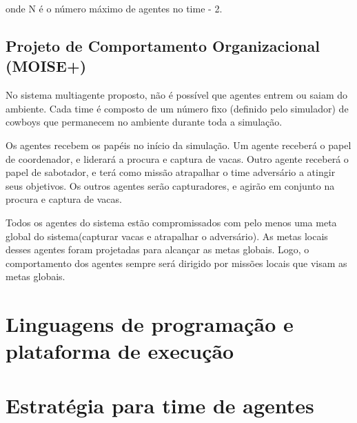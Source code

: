 \documentclass{llncs}
\begin{document}
onde N é o número máximo de agentes no time - 2.

\subsection{Projeto de Comportamento Organizacional (MOISE+)}

No sistema multiagente proposto, não é possível que agentes entrem ou saiam do ambiente. Cada time é composto de um número fixo (definido pelo simulador) de cowboys que permanecem no ambiente durante toda a simulação.

Os agentes recebem os papéis no início da simulação. Um agente receberá o papel de coordenador, e liderará a procura e captura de vacas. Outro agente receberá o papel de sabotador, e terá como missão atrapalhar o time adversário a atingir seus objetivos. Os outros agentes serão capturadores, e agirão em conjunto na procura e captura de vacas.

Todos os agentes do sistema estão compromissados com pelo menos uma meta global do sistema(capturar vacas e atrapalhar o adversário). As metas locais desses agentes foram projetadas para alcançar as metas globais. Logo, o comportamento dos agentes sempre será dirigido por missões locais que visam as metas globais.


\section{Linguagens de programação e plataforma de execução}



\section{Estratégia para time de agentes}

\end{document}
